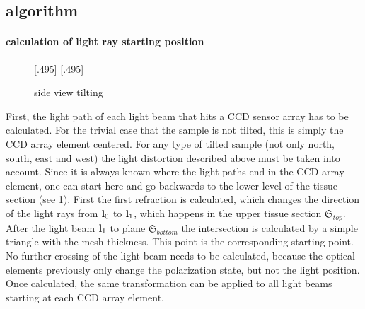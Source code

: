 \subsection{algorithm}
% 
\paragraph{calculation of light ray starting position}
% 
\begin{figure}[!t]
\def\tikzwidth{0.42\textwidth}
[.495\textwidth]{
\def\tilt{0}
\def\nindex{2.25}
}\hfill
{}[.495\textwidth]{
}
\caption{side view tilting}
\label{fig:tilted_side_view}
\end{figure}
% 
First, the light path of each light beam that hits a \ac{CCD} sensor array has to be calculated.
For the trivial case that the sample is not tilted, this is simply the \ac{CCD} array element centered.
For any type of tilted sample (not only north, south, east and west) the light distortion described above must be taken into account.
Since it is always known where the light paths end in the \ac{CCD} array element, one can start here and go backwards to the lower level of the tissue section (see \cref{fig:tilted_side_view}).
First the first refraction is calculated, which changes the direction of the light rays from $\mathbf{l}_0$ to $\mathbf{l}_1$, which happens in the upper tissue section $\mathfrak{S}_{top}$.
After the light beam $\mathbf{l}_1$ to plane $\mathfrak{S}_{bottom}$ the intersection is calculated by a simple triangle with the mesh thickness.
This point is the corresponding starting point.
No further crossing of the light beam needs to be calculated, because the optical elements previously only change the polarization state, but not the light position.
Once calculated, the same transformation can be applied to all light beams starting at each \ac{CCD} array element.
% 
\begin{lstfloat}[!t]
	
	\caption{Pseudocode simulation}
	\label{alg:simulation}
\end{lstfloat}
% 
% 
